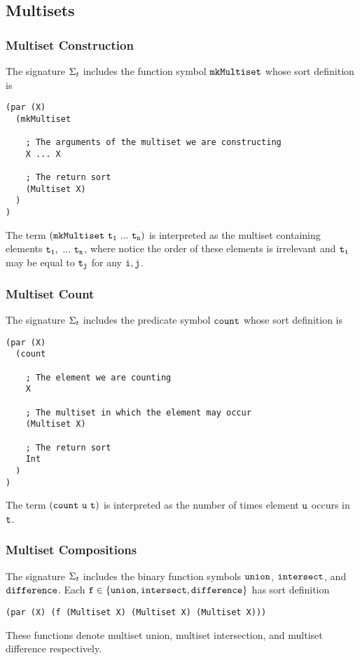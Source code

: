 \documentclass[english,a4paper,10pt]{article}
\begin{document}
\subsection{Multisets}

\subsubsection{Multiset Construction}
The signature $\Sigma_{t}$ includes 
the function symbol ${\tt mkMultiset}$ whose sort definition is
\begin{verbatim}
(par (X) 
  (mkMultiset
  
    ; The arguments of the multiset we are constructing
    X ... X
    
    ; The return sort
    (Multiset X)
  )
)
\end{verbatim}
The term $\syntax{(mkMultiset\ t_1\ ...\ t_n)}$ is
interpreted as the multiset containing elements ${\tt t_1,\ ...\ t_n}$, 
where notice the order of these elements is irrelevant
and ${\tt t_i}$ may be equal to ${\tt t_j}$ for any ${\tt i},{\tt j}$.

\subsubsection{Multiset Count}
The signature $\Sigma_{t}$ includes 
the predicate symbol ${\tt count}$ whose sort definition is
\begin{verbatim}
(par (X)
  (count 
  
    ; The element we are counting
    X 
    
    ; The multiset in which the element may occur
    (Multiset X)
    
    ; The return sort
    Int
  )
)
\end{verbatim}
The term ${\tt (count\ u\ t)}$ is
interpreted as the number of times element ${\tt u}$ occurs in ${\tt t}$.

\subsubsection{Multiset Compositions}
The signature $\Sigma_{t}$ includes 
the binary function symbols 
${\tt union}$, ${\tt intersect}$, and ${\tt difference}$.
Each ${\tt f} \in \{ {\tt union}, {\tt intersect}, {\tt difference} \}$
has sort definition
\begin{verbatim}
(par (X) (f (Multiset X) (Multiset X) (Multiset X)))
\end{verbatim}
These functions denote multiset union, multiset intersection, and multiset difference
respectively.
\end{document}
